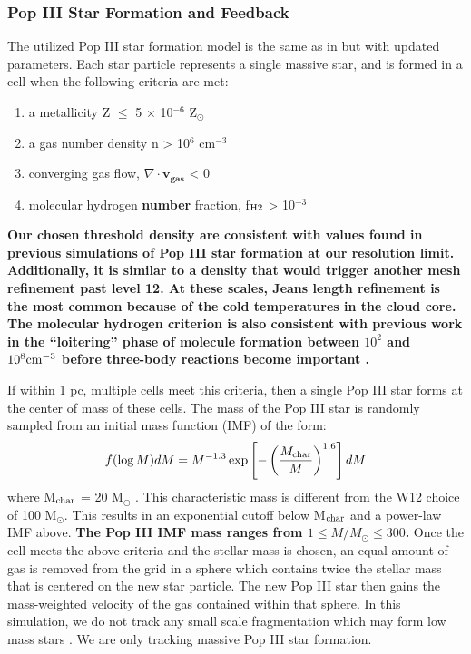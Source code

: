 \documentclass[fleqn,usenatbib]{mnras}
\begin{document}
\subsubsection{Pop III Star Formation and Feedback }
The utilized Pop III star formation model is the same as in \citet{Wise08_Gal} but with updated parameters. Each star particle represents a single massive star, and is formed in a cell when the following criteria are met: 
\begin{enumerate}
	\item a metallicity Z $\leq$ 5 $\times$ 10$^{-6}$ Z$_{\odot}$

	\item a gas number density n > 10$^{6}$ cm$^{-3}$

	\item converging gas flow, $\nabla \cdot \mathbf{v_{gas}}$ < 0 

	\item molecular hydrogen \textbf{number} fraction, f$_{\rm H2}$ > 10$^{-3}$
\end{enumerate}
\textbf{Our chosen threshold density are consistent with values found in previous simulations of Pop III star formation \citep[e.g.][]{Hirano15} at our resolution limit.  Additionally, it is similar to a density that would trigger another mesh refinement past level 12.  At these scales, Jeans length refinement is the most common because of the cold temperatures in the cloud core.  The molecular hydrogen criterion is also consistent with previous work in the ``loitering'' phase of molecule formation between $10^2$ and $10^8 \cubecm$ before three-body reactions become important \citep[e.g.][]{Omukai10}.}

If within 1 pc, multiple cells meet this criteria, then a single Pop III star forms at the center of mass of these cells. The mass of the Pop III star is randomly sampled from an initial mass function (IMF) of the form:
\begin{equation} \label{IMF}
	f(\log M)dM = M^{-1.3} \exp \left[-\left( \frac{M_{\rm char}}{M}\right)^{1.6} \right]dM
\end{equation}
where M$_{\rm char}$ = 20 M$_{\odot}$ \citep{Hirano17}. This characteristic mass is different from the W12 choice of 100 M$_{\odot}$. This results in an exponential cutoff below M$_{\rm char}$ and a power-law IMF above. \textbf{The Pop III IMF mass ranges from $1 \leq M / M_{\odot} \leq 300$. }Once the cell meets the above criteria and the stellar mass is chosen, an equal amount of gas is removed from the grid in a sphere which contains twice the stellar mass that is centered on the new star particle. The new Pop III star then gains the mass-weighted velocity of the gas contained within that sphere. In this simulation, we do not track any small scale fragmentation which may form low mass stars \citep{Greif11_P3Cluster}. We are only tracking massive Pop III star formation.
\end{document}
